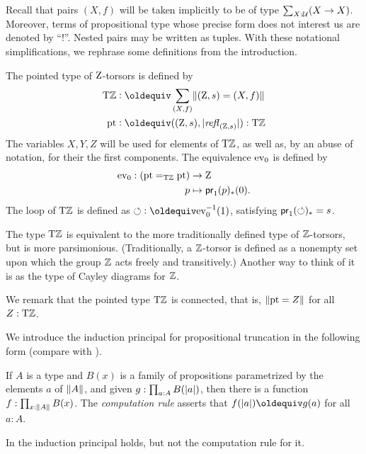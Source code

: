 \documentclass[a4,12pt]{amsart}
\begin{document}
Recall that pairs $(X,f)$ will be taken implicitly to be of type $\sum_{X:\mathcal{U}}(X\to X)$.
Moreover, terms of propositional type whose precise form does not interest us are denoted by ``$!$''.
Nested pairs may be written as tuples.
With these notational simplifications, we rephrase some definitions from the introduction.

\begin{definition}\label{def:TorZ}
  The pointed type of $\mathrm{Z}$-torsors is defined by
  \begin{align*}
    \TorZ &\defeq \sum_{(X,f)}\Trunc{(\zet,s)=(X,f)}  \\
    \pt & \defeq ((\zet,s),\trunc{\refl{(\zet,s)}}) : \TorZ
  \end{align*}
  The variables $X,Y,Z$ will be used for elements of ${\mathrm{T}\mathbb{Z}}$, 
  as well as, by an abuse of notation, for their the first components.
  The equivalence $\mathrm{ev}_0$ is defined by
  \begin{align*}
    \mathrm{ev}_0: ({\mathord{\mathrm{pt}}} =_{\mathrm{T}\mathbb{Z}} {\mathord{\mathrm{pt}}}) & \to\mathrm{Z} \\
    p & \mapsto \mathsf{pr}_1(p)_*(0).
  \end{align*}
  The loop of ${\mathrm{T}\mathbb{Z}}$ is defined as ${\Zloop}\defeq\ev_0^{-1}(1)$,
  satisfying $\mathsf{pr}_1(\circlearrowleft)_* = s$.
\end{definition}

The type ${\mathrm{T}\mathbb{Z}}$ is equivalent to the more traditionally defined 
type of $\mathbb{Z}$-torsors, but is more parsimonious.
(Traditionally, a $\mathbb{Z}$-torsor is defined as a nonempty set upon which the group $\mathbb{Z}$ acts freely and transitively.)
Another way to think of it is as the type of Cayley diagrams for $\mathbb{Z}$.

We remark that the pointed type ${\mathrm{T}\mathbb{Z}}$ is connected, that is, $\lVert{\mathord{\mathrm{pt}}}=Z\rVert$ for all $Z:{\mathrm{T}\mathbb{Z}}$.

We introduce the induction principal for propositional truncation in the following form (compare with \cite[Ch. 6.9]{hottbook}).

\begin{definition}\label{def:proptruncind}
  If $A$ is a type and $B(x)$ is a family of propositions parametrized by the elements $a$ of $\lVert A\rVert$,
  and given $g : \prod_{a:A} B(\lvert a\rvert)$, then there is a function $f : \prod_{x:\lVert A\rVert} B(x)$.
  The \emph{computation rule} asserts that $f (\trunc a) \jdeq g(a)$ for all $a:A$.
\end{definition}

In {\UniMath} the induction principal holds, but not the computation rule for it.
\end{document}
